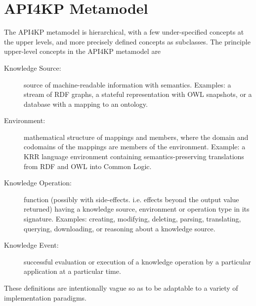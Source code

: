 \documentclass[runningheads]{llncs}
\begin{document}
\section{API4KP Metamodel}
\label{sec:metamodel}
The API4KP metamodel is hierarchical, with a few under-specified concepts at the upper levels, and more precisely defined concepts as subclasses.
The principle upper-level concepts in the API4KP metamodel are
\begin{description}
\item[Knowledge Source:] source of machine-readable information with semantics. Examples: a stream of RDF graphs, a stateful representation with OWL snapshots, or a database with a mapping to an ontology.
\item[Environment:] mathematical structure of mappings and members, where the domain and codomains of the mappings are members of the environment.  Example: a KRR language environment containing semantics-preserving translations from RDF and OWL into Common Logic.
\item[Knowledge Operation:] function (possibly with side-effects. i.e. effects beyond the output value returned) having a knowledge source, environment or operation type in its signature. Examples: creating, modifying, deleting, parsing, translating, querying, downloading, or reasoning about a knowledge source.
\item[Knowledge Event:] successful evaluation or execution of a knowledge operation by a particular application at a particular time.
\end{description}
These definitions are intentionally vague so as to be adaptable to a variety of implementation paradigms.
\end{document}
